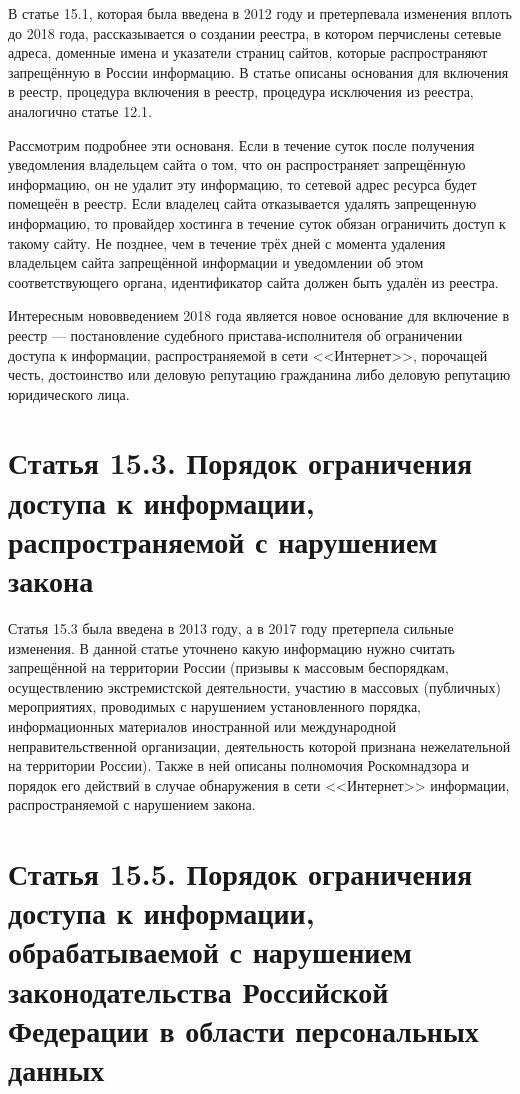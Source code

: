 В статье 15.1, которая была введена в 2012 году и претерпевала изменения вплоть до 2018 года, рассказывается о создании реестра, в котором перчислены сетевые адреса, доменные имена и указатели страниц сайтов, которые распространяют запрещённую в России информацию. В статье описаны основания для включения в реестр, процедура включения в реестр, процедура исключения из реестра, аналогично статье 12.1. 

Рассмотрим подробнее эти основаня. Если в течение суток после получения уведомления владельцем сайта о том, что он распространяет запрещённую информацию, он не удалит эту информацию, то сетевой адрес ресурса будет помещеён в реестр. Если владелец сайта отказывается удалять запрещенную информацию, то провайдер хостинга в течение суток обязан ограничить доступ к такому сайту. Не позднее, чем в течение трёх дней с момента удаления владельцем сайта запрещённой информации и уведомлении об этом соответствующего органа, идентификатор сайта должен быть удалён из реестра.

Интересным нововведением 2018 года является новое основание для включение в реестр --- постановление судебного пристава-исполнителя об ограничении доступа к информации, распространяемой в сети <<Интернет>>, порочащей честь, достоинство или деловую репутацию гражданина либо деловую репутацию юридического лица.

\section{Статья 15.3. Порядок ограничения доступа к информации, распространяемой с нарушением закона}

Статья 15.3 была введена в 2013 году, а в 2017 году претерпела сильные изменения. В данной статье уточнено какую информацию нужно считать запрещённой на территории России (призывы к массовым беспорядкам, осуществлению экстремистской деятельности, участию в массовых (публичных) мероприятиях, проводимых с нарушением установленного порядка, информационных материалов иностранной или международной неправительственной организации, деятельность которой признана нежелательной на территории России). Также в ней описаны полномочия Роскомнадзора и порядок его действий в случае обнаружения в сети <<Интернет>> информации, распространяемой с нарушением закона.

\section{Статья 15.5. Порядок ограничения доступа к информации, обрабатываемой с нарушением законодательства Российской Федерации в области персональных данных}

